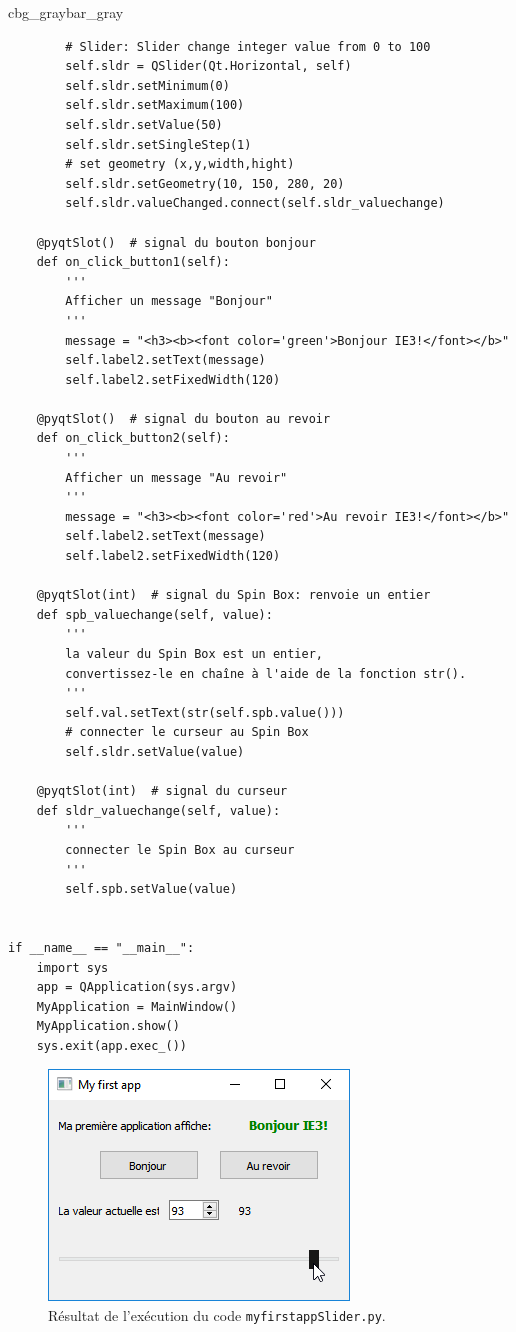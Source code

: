 \documentclass[%
oneside,                 %
final,                   %
10pt,french]{article}
\newenvironment{_pro_tight}[2]{
   \def\FrameCommand{\color{#2}\vrule width 1mm\normalcolor\colorbox{#1}}
   \FrameRule0.6pt\MakeFramed {\advance\hsize-2mm\FrameRestore}\vskip3mm}
   {\vskip0mm\endMakeFramed}
\newenvironment{pro}[2]{
\bgroup\rmfamily
\fboxsep=0mm\relax
\begin{_pro_tight}{#1}{#2}
\list{}{\parsep=-2mm\parskip=0mm\topsep=0pt\leftmargin=2mm
\rightmargin=2\leftmargin\leftmargin=4pt\relax}
\item\relax}
{\endlist\end{_pro_tight}\egroup}
\begin{document}
\begin{pro}{cbg_gray}{bar_gray}
\begin{verbatim}
        # Slider: Slider change integer value from 0 to 100
        self.sldr = QSlider(Qt.Horizontal, self)
        self.sldr.setMinimum(0)
        self.sldr.setMaximum(100)
        self.sldr.setValue(50)
        self.sldr.setSingleStep(1)
        # set geometry (x,y,width,hight)
        self.sldr.setGeometry(10, 150, 280, 20)
        self.sldr.valueChanged.connect(self.sldr_valuechange)

    @pyqtSlot()  # signal du bouton bonjour
    def on_click_button1(self):
        '''
        Afficher un message "Bonjour"
        '''
        message = "<h3><b><font color='green'>Bonjour IE3!</font></b>"
        self.label2.setText(message)
        self.label2.setFixedWidth(120)

    @pyqtSlot()  # signal du bouton au revoir
    def on_click_button2(self):
        '''
        Afficher un message "Au revoir"
        '''
        message = "<h3><b><font color='red'>Au revoir IE3!</font></b>"
        self.label2.setText(message)
        self.label2.setFixedWidth(120)

    @pyqtSlot(int)  # signal du Spin Box: renvoie un entier
    def spb_valuechange(self, value):
        '''
        la valeur du Spin Box est un entier,
        convertissez-le en chaîne à l'aide de la fonction str().
        '''
        self.val.setText(str(self.spb.value()))
        # connecter le curseur au Spin Box
        self.sldr.setValue(value)

    @pyqtSlot(int)  # signal du curseur
    def sldr_valuechange(self, value):
        '''
        connecter le Spin Box au curseur
        '''
        self.spb.setValue(value)


if __name__ == "__main__":
    import sys
    app = QApplication(sys.argv)
    MyApplication = MainWindow()
    MyApplication.show()
    sys.exit(app.exec_())
\end{verbatim}
\end{pro}
\noindent


\begin{figure}[!ht]  %
  \centerline{\includegraphics[width=0.4\linewidth]{imgs/myfirstappSlider2.png}}
  \caption{
  Résultat de l'exécution du code \texttt{myfirstappSlider.py}. \label{fig:myfirstappSlider}
  }
\end{figure}
\end{document}

